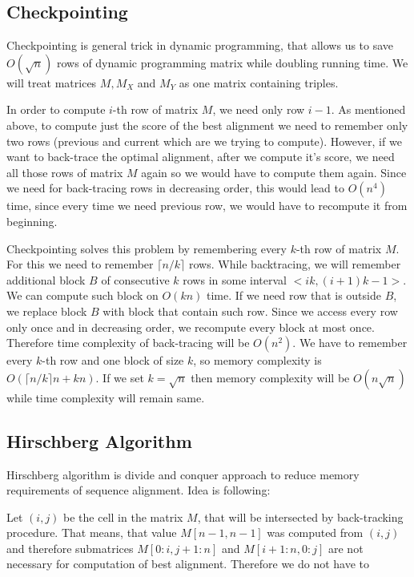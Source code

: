 \subsection{Checkpointing}

Checkpointing is general trick in dynamic programming, that allows us to save
$O(\sqrt n)$ rows of dynamic programming matrix while doubling running time.
We will treat matrices $M,M_X$ and $M_Y$ as one matrix containing triples.

In order to compute $i$-th row of matrix $M$, we need only row
$i-1$. As mentioned above, to compute just the score of the best alignment we
need to remember only two rows (previous and current which are we trying to
compute). However, if we want to back-trace the optimal alignment, after we
compute it's score, we need all those rows of matrix $M$ again so we would have
to compute them again. Since we need for back-tracing rows in decreasing order,
this would lead to $O(n^4)$ time, since every time we need previous row, we
would have to recompute it from beginning.

Checkpointing solves this problem by remembering every $k$-th row of matrix $M$.
For this we need to remember $\lceil n/k\rceil$ rows.
While backtracing, we will remember additional block $B$ of consecutive $k$ rows in
some interval $<ik,(i+1)k-1>$. We can compute such block on $O(kn)$ time. 
If we need row that is outside $B$, we replace block $B$ with block that contain
such row. Since we access every row only once and in decreasing order, we
recompute every block at most once. Therefore time complexity of back-tracing
will be $O(n^2)$. We have to remember every $k$-th row and one block of size
$k$, so memory complexity is $O(\lceil n/k\rceil n+ kn)$. If we set $k=\sqrt n$
then memory complexity will be $O(n\sqrt n)$ while time complexity will remain
same.


\subsection{Hirschberg Algorithm}

Hirschberg algorithm is divide and conquer approach to reduce memory
requirements of sequence alignment. Idea is following:

Let $(i,j)$ be the cell in the matrix $M$, that will be intersected by
back-tracking procedure. That means, that value $M[n-1,n-1]$ was computed 
from $(i,j)$ and therefore submatrices $M[0:i,j+1:n]$ and $M[i+1:n,0:j]$
are not necessary for computation of best alignment. Therefore we do not have to 


